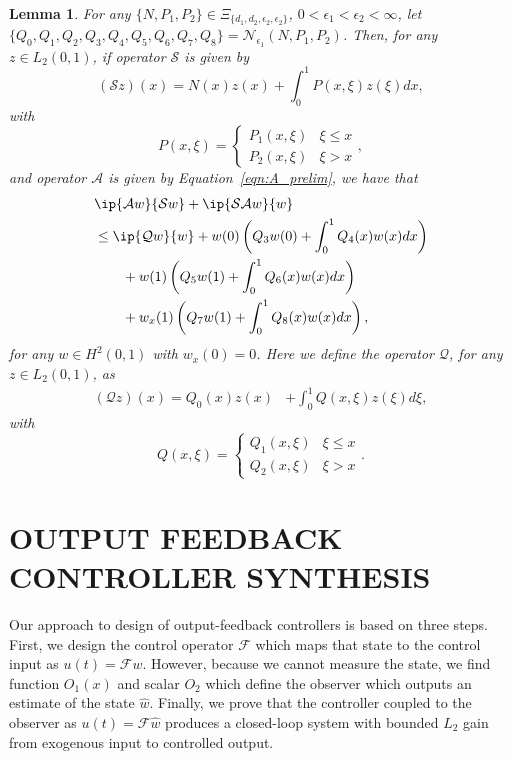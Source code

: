 \documentclass[US letter, 9 pt, conference]{ieeeconf}  \usepackage{setspace}
\newtheorem{lemma}{Lemma}
\newcommand{\igzo}{\int_0^1}
\newcommand{\lt}{L_2(0,1)}
\newcommand{\mcl}[1]{\mathcal{#1}}
\newcommand{\sop}{\mathcal{S}}
\begin{document}
\begin{lemma}\label{lem:primal_LOI}
For any $\{N,P_1,P_2\} \in \Xi_{\{d_1,d_2,\epsilon_2,\epsilon_2\}}$, $0<\epsilon_1<\epsilon_2<\infty$, let $\{Q_0,Q_1,Q_2,Q_3,Q_4,Q_5,Q_6,Q_7,Q_8\}=\mcl{N}_{\epsilon_1}\left(N,P_1,P_2\right)$. Then, for any $z \in \lt$, if operator $\sop$ is given by
\begin{equation}\label{eqn:sop}
\left(\sop z \right)(x)=N(x)z(x)+\igzo P(x,\xi)z(\xi)dx,
\end{equation}
 with
\[P(x,\xi) = \begin{cases} P_1(x,\xi) & \xi \leq x \\
P_2(x,\xi) &  \xi>x \end{cases} ,\]
and operator $\mcl{A}$ is given by Equation~\eqref{eqn:A_prelim},
we have that
\begin{align*}
&\ip{\mcl{A}w}{\sop w}+\ip{\mcl{SA}w}{w}\\
&\leq  \ip{\mcl{Q}w}{w}+w(0)\left(Q_3 w(0) + \igzo Q_4(x)w(x)dx \right) \\
& \quad \quad +w(1) \left(Q_5w(1)+\igzo Q_6(x)w(x)dx \right) \\
& \quad \quad + w_x(1)\left(Q_7w(1)+ \igzo Q_8(x)w(x)dx\right),
\end{align*} for any $w \in H^2(0,1)$ with $w_x(0)=0$. Here we define the operator $\mcl{Q}$, for any $z \in \lt$, as
\begin{align*}
\left(\mcl{Q}z \right)(x)=Q_0(x)z(x)&+\igzo Q(x,\xi)z(\xi)d \xi,
\end{align*} with
\[Q(x,\xi) = \begin{cases} Q_1(x,\xi) & \xi \leq x \\
Q_2(x,\xi) &  \xi>x \end{cases}.\]
\end{lemma}
\section{OUTPUT FEEDBACK CONTROLLER SYNTHESIS}\label{sec:control}

Our approach to design of output-feedback controllers is based on three steps. First, we design the control operator $\mcl{F}$ which maps that state to the control input as $u(t)=\mcl{F}w$. However, because we cannot measure the state, we find function $O_1(x)$ and scalar $O_2$ which define the observer which outputs an estimate of the state $\hat w$. Finally, we prove that the controller coupled to the observer as $u(t)=\mcl{F}\hat w$ produces a closed-loop system with bounded $L_2$ gain from exogenous input to controlled output.
\end{document}
